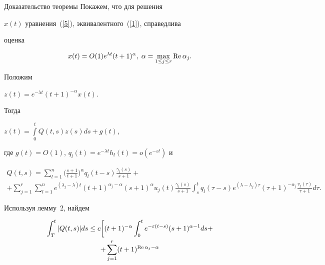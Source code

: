 \begin{pf*}{Доказательство теоремы} Покажем, что для решения


$x (t)$ уравнения~(\ref{5}), эквивалентного~(\ref{1}), справедлива


оценка


\begin{equation}


\label{9}


x(t)=O (1)e^{\lambda t}(t+1)^{\alpha},\; \alpha=


\max\limits_{1\le j\le r} \re \alpha_j.


\end{equation}


Положим


$z (t)=e^{-\lambda t}(t+1)^{-\alpha} x(t)$.


Тогда


$z(t)=\int\limits_0^t Q(t,s) z(s)ds+g(t)$,


где $g(t)=O(1)$, $q_l (t)=e^{-\lambda t} h_l (t)=


o(e^{-\varepsilon t})$ и


\begin{gather*}


Q(t,s)=\sum\limits_{l=1}^n \bigg(\frac {s+1}{t+1} \bigg)^{\alpha}


q_l (t-s)\frac{\gamma_l (s)}{s+1}+\\


%


+\sum\limits_{j=1}^r \sum\limits_{l=1}^n e^{(\lambda_j-\lambda)t}


(t+1)^{\alpha_{j}-\alpha} (s+1)^{\alpha}


u_j (t) \frac{\gamma_l (s)}{s+1}


\int_{s}^t q_l (\tau-s)


e^{(\lambda-\lambda_j)\tau} (\tau+1)^{-\alpha_{j}}


\frac{v_j (\tau)}{\tau+1}d\tau.


\end{gather*}


Используя лемму~2, найдем


\begin{gather*}


\int_T^t |Q(t, s)|ds \le c \bigg[ (t+1)^{-\alpha}


\int_0^t e^{-\varepsilon(t-s)} (s+1)^{\alpha-1}ds+\\


%


+\sum\limits_{j=1}^r (t+1)^{\re \alpha_{j}-\alpha}



\end{gather*}
\end{pf*}
